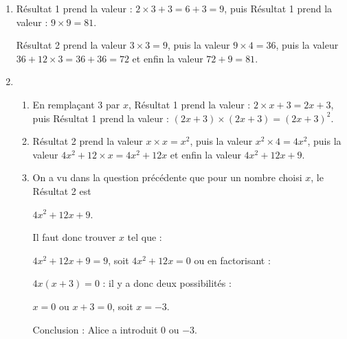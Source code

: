 \documentclass[10pt]{article}
\begin{document}
\setlength\parindent{0mm}
\pagestyle{fancy}
\thispagestyle{empty}
    
    
    




\medskip

\begin{enumerate}
\item Résultat 1 prend la valeur : $2 \times 3 + 3 = 6 + 3 = 9$, puis Résultat 1 prend la valeur : $9 \times 9 = 81$.

Résultat 2 prend la valeur $3 \times 3 = 9$, puis la valeur $9 \times 4 = 36$, puis la valeur $36 + 12 \times 3 = 36 + 36 = 72$ et enfin la valeur $72 + 9 = 81$.
\item
	\begin{enumerate}
		\item En remplaçant 3 par $x$, Résultat 1 prend la valeur : $2 \times x + 3 = 2x + 3$, puis Résultat 1 prend la valeur : $(2x + 3)\times (2x + 3) = (2x + 3)^2$.
		\item Résultat 2 prend la valeur $x \times x = x^2$, puis la valeur $x^2 \times 4 = 4x^2$, puis la valeur $4x^2 + 12 \times x = 4x^2 + 12x$ et enfin la valeur $4x^2 + 12x + 9$.
		\item On a vu dans la question précédente que pour un nombre choisi $x$, le Résultat 2 est 
		
$4x^2 + 12x + 9$.
		
Il faut donc trouver $x$ tel que :
		
$4x^2 + 12x + 9 = 9$, soit $4x^2 + 12x = 0$ ou en factorisant :
		
$4x(x + 3) = 0$ : il y a donc deux possibilités :
		
$x = 0$ ou $x + 3 = 0$, soit  $x = - 3$.
		
Conclusion : Alice a introduit $0$ ou $- 3$.
	\end{enumerate}
\end{enumerate}
\end{document}
